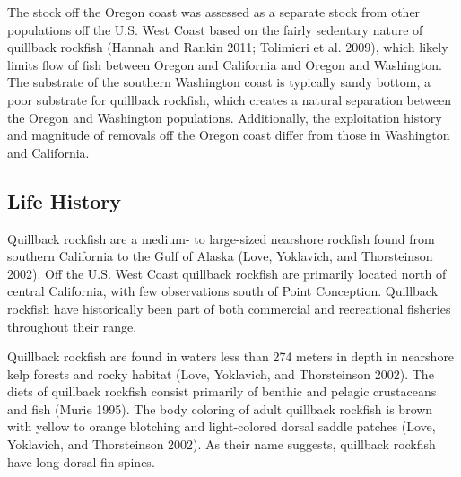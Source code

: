 \documentclass[11pt,
  english,
  a4paper,
]{article}
\begin{document}
\leavevmode\tagmcend\tagstructend\par


The stock off the Oregon coast was assessed as a separate stock from other populations off the U.S. West Coast based on the fairly sedentary nature of quillback rockfish {(Hannah and Rankin 2011; Tolimieri et al. 2009)\leavevmode\tagmcend\tagstructend}, which likely limits flow of fish between Oregon and California and Oregon and Washington. The substrate of the southern Washington coast is typically sandy bottom, a poor substrate for quillback rockfish, which creates a natural separation between the Oregon and Washington populations. Additionally, the exploitation history and magnitude of removals off the Oregon coast differ from those in Washington and California.

\leavevmode\tagmcend\tagstructend\par


\hypertarget{life-history}{%
\subsection{Life History}\label{life-history}}

\leavevmode\tagmcend\tagstructend


Quillback rockfish are a medium- to large-sized nearshore rockfish found from southern California to the Gulf of Alaska {(Love, Yoklavich, and Thorsteinson 2002)\leavevmode\tagmcend\tagstructend}. Off the U.S. West Coast quillback rockfish are primarily located north of central California, with few observations south of Point Conception. Quillback rockfish have historically been part of both commercial and recreational fisheries throughout their range.

\leavevmode\tagmcend\tagstructend\par


Quillback rockfish are found in waters less than 274 meters in depth in nearshore kelp forests and rocky habitat {(Love, Yoklavich, and Thorsteinson 2002)\leavevmode\tagmcend\tagstructend}. The diets of quillback rockfish consist primarily of benthic and pelagic crustaceans and fish {(Murie 1995)\leavevmode\tagmcend\tagstructend}. The body coloring of adult quillback rockfish is brown with yellow to orange blotching and light-colored dorsal saddle patches {(Love, Yoklavich, and Thorsteinson 2002)\leavevmode\tagmcend\tagstructend}. As their name suggests, quillback rockfish have long dorsal fin spines.
\end{document}
